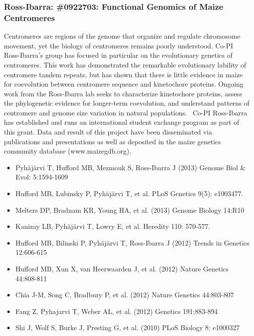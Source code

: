 \subsubsection*{Ross-Ibarra: \#0922703: Functional Genomics of Maize Centromeres}
Centromeres are regions of the genome that organize and regulate chromosome movement, yet the biology of centromeres remains poorly understood. Co-PI Ross-Ibarra's group has focused in particular on the evolutionary genetics of centromeres. This work has demonstrated the remarkable evolutionary lability of centromere tandem repeats, but has shown that there is little evidence in maize for coevolution between centromere sequence and kinetochore proteins. Ongoing work from the Ross-Ibarra lab seeks to characterize kinetochore proteins, assess the phylogenetic evidence for longer-term coevolution, and understand patterns of centromere and genome size variation in natural populations. 
Co-PI Ross-Ibarra has established and runs an international student exchange program as part of this grant. Data and result of this project have been disseminated via publications and presentations as well as deposited in the maize genetics community database (www.maizegdb.org).
 
\begin{itemize}
\item Pyhäjärvi T, Hufford MB, Mezmouk S, Ross-Ibarra J (2013) Genome Biol \& Evol:  5:1594-1609
\item Hufford MB, Lubinsky P, Pyh\"aj\"arvi T, et al. PLoS Genetics 9(5): e1003477.
\item Melters DP, Bradnam KR, Young HA, et al. (2013) Genome Biology 14:R10
\item Kanizay LB, Pyhäjärvi T, Lowry E, et al. Heredity 110: 570-577.
\item Hufford MB, Bilinski P, Pyh\"aj\"arvi T, Ross-Ibarra J (2012) Trends in Genetics 12:606-615
\item Hufford MB, Xun X, van Heerwaarden J, et al. (2012) Nature Genetics 44:808-811
\item Chia J-M, Song C, Bradbury P, et al. (2012) Nature Genetics 44:803-807
\item Fang Z, Pyhajarvi T, Weber AL, et al. (2012) Genetics 191:883-894
\item Shi J, Wolf S, Burke J, Presting G, et al.  (2010) PLoS Biology 8: e1000327
\end{itemize}



